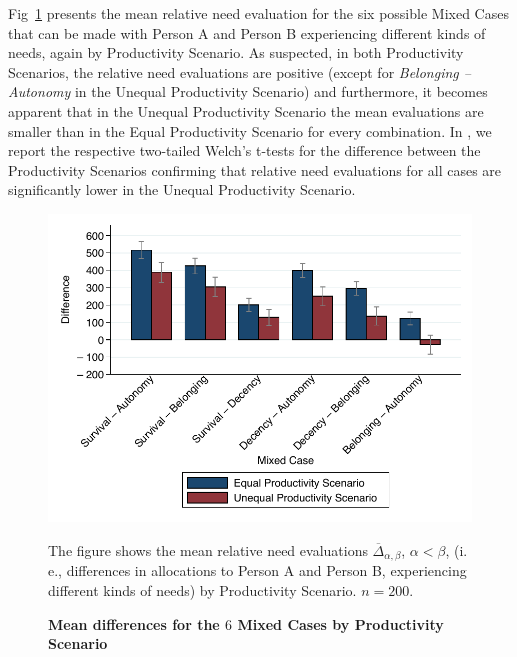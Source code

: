 \documentclass[10pt,letterpaper]{article}
\begin{document}
Fig~\ref{fig:overview_mixed} presents the mean relative need evaluation for the six possible Mixed Cases that can be made with Person A and Person B experiencing different kinds of needs, again by Productivity Scenario.
As suspected, in both Productivity Scenarios, the relative need evaluations are positive (except for \textit{Belonging -- Autonomy} in the Unequal Productivity Scenario) and furthermore, it becomes apparent that in the Unequal Productivity Scenario the mean evaluations are smaller than in the Equal Productivity Scenario for every combination.
In , we report the respective two-tailed Welch's t-tests for the difference between the Productivity Scenarios confirming that relative need evaluations for all cases are significantly lower in the Unequal Productivity Scenario.

\begin{figure}[t]
   \includegraphics[width=\textwidth]{figures/figure_5.pdf}
   \caption{\bf Mean differences for the $6$ Mixed Cases by Productivity Scenario}
   The figure shows the mean relative need evaluations $\overline{\Delta}_{\alpha,\beta}$, $\alpha<\beta$, (i.\,e., differences in allocations to Person A and Person B, experiencing different kinds of needs) by Productivity Scenario. $n=200$.
   \label{fig:overview_mixed}
\end{figure}
\end{document}

